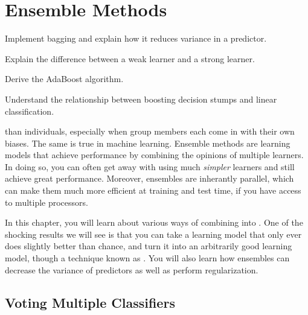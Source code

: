 \chapter{Ensemble Methods} \label{sec:ens}


\begin{learningobjectives}
\item Implement bagging and explain how it reduces variance in a
  predictor.
\item Explain the difference between a weak learner and a strong
  learner.
\item Derive the AdaBoost algorithm.
\item Understand the relationship between boosting decision stumps and
  linear classification.
\end{learningobjectives}

\dependencies{}

 than
individuals, especially when group members each come in with their own
biases.  The same is true in machine learning.  Ensemble methods are
learning models that achieve performance by combining the opinions of
multiple learners.  In doing so, you can often get away with using
much \emph{simpler} learners and still achieve great performance.
Moreover, ensembles are inherantly parallel, which can make them much
more efficient at training and test time, if you have access to
multiple processors.

In this chapter, you will learn about various ways of combining
 into
.  One of the shocking results we will
see is that you can take a learning model that only ever does slightly
better than chance, and turn it into an arbitrarily good learning
model, though a technique known as .  You will also
learn how ensembles can decrease the variance of predictors as well as
perform regularization.

\section{Voting Multiple Classifiers}

